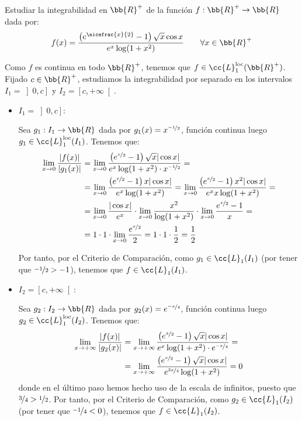 \begin{ejercicio}
    Estudiar la integrabilidad en $\bb{R}^+$ de la función $f:\bb{R}^+\to \bb{R}$ dada por:
    \begin{equation*}
        f(x) = \dfrac{\left(e^{\nicefrac{x}{2}} -1\right)\sqrt{x}\cos x}{e^x \log(1+x^2)}
        \qquad \forall x\in \bb{R}^+
    \end{equation*}

    Como $f$ es continua en todo $\bb{R}^+$, tenemos que $f\in \cc{L}_1^{\text{loc}}(\bb{R}^+)$.
    Fijado $c\in \bb{R}^+$, estudiamos la integrabilidad por separado en los intervalos $I_1=\left]0,c\right]$ y $I_2=\left[c,+\infty\right[$.
    \begin{itemize}
        \item \ul{$I_1=\left]0,c\right]$}:
        
        Sea $g_1:I_1\to \bb{R}$ dada por $g_1(x)=x^{\nicefrac{-1}{2}}$, función continua luego $g_1\in \cc{L}_1^{\text{loc}}(I_1)$. Tenemos que:
        \begin{align*}
            \lim_{x\to 0} \dfrac{|f(x)|}{|g_1(x)|}
            &= \lim_{x\to 0} \dfrac{\left(e^{\nicefrac{x}{2}} -1\right)\sqrt{x}|\cos x|}{e^x \log(1+x^2)\cdot x^{\nicefrac{-1}{2}}}
            =\\&= \lim_{x\to 0} \dfrac{\left(e^{\nicefrac{x}{2}} -1\right)x|\cos x|}{e^x \log(1+x^2)}
            = \lim_{x\to 0} \dfrac{\left(e^{\nicefrac{x}{2}} -1\right)x^2|\cos x|}{e^x x\log(1+x^2)} =\\
            &= \lim_{x\to 0} \dfrac{|\cos x|}{e^x} \cdot \lim_{x\to 0} \dfrac{x^2}{\log(1+x^2)} \cdot \lim_{x\to 0} \dfrac{e^{\nicefrac{x}{2}} -1}{x}=\\
            &= 1\cdot 1\cdot \lim_{x\to 0} \dfrac{e^{\nicefrac{x}{2}}}{2} = 1\cdot 1\cdot \dfrac{1}{2} = \dfrac{1}{2}
        \end{align*}

        Por tanto, por el Criterio de Comparación, como $g_1\in \cc{L}_1(I_1)$ (por tener que $\nicefrac{-1}{2}>-1$), tenemos que $f\in \cc{L}_1(I_1)$.

        \item \ul{$I_2=\left[c,+\infty\right[$}:
        
        Sea $g_2:I_2\to \bb{R}$ dada por $g_2(x)=e^{\nicefrac{-x}{4}}$, función continua luego $g_2\in \cc{L}_1^{\text{loc}}
        (I_2)$. Tenemos que:
        \begin{align*}
            \lim_{x\to +\infty} \dfrac{|f(x)|}{|g_2(x)|}
            &= \lim_{x\to +\infty} \dfrac{\left(e^{\nicefrac{x}{2}} -1\right)\sqrt{x}|\cos x|}{e^x \log(1+x^2)\cdot e^{\nicefrac{-x}{4}}}
            =\\&= \lim_{x\to +\infty} \dfrac{\left(e^{\nicefrac{x}{2}} -1\right)\sqrt{x}|\cos x|}{e^{\nicefrac{3x}{4}} \log(1+x^2)}
            = 0
        \end{align*}
        donde en el último paso hemos hecho uso de la escala de infinitos, puesto que $\nicefrac{3}{4}>\nicefrac{1}{2}$. Por tanto, por el Criterio de Comparación, como $g_2\in \cc{L}_1(I_2)$ (por tener que $\nicefrac{-1}{4}<0$), tenemos que $f\in \cc{L}_1(I_2)$.
    \end{itemize}
\end{ejercicio}